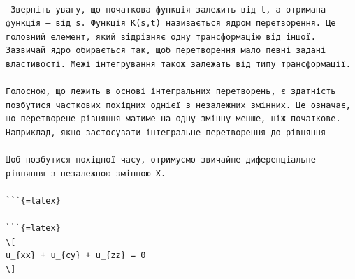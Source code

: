 \documentclass[
  ukrainian,
]{article}
\begin{document}
\begin{verbatim}

 Зверніть увагу, що початкова функція залежить від t, а отримана функція — від s. Функція K(s,t) називається ядром перетворення. Це головний елемент, який відрізняє одну трансформацію від іншої. Зазвичай ядро обирається так, щоб перетворення мало певні задані властивості. Межі інтегрування також залежать від типу трансформації.

Голосною, що лежить в основі інтегральних перетворень, є здатність позбутися часткових похідних однієї з незалежних змінних. Це означає, що перетворене рівняння матиме на одну змінну менше, ніж початкове. Наприклад, якщо застосувати інтегральне перетворення до рівняння

Щоб позбутися похідної часу, отримуємо звичайне диференціальне рівняння з незалежною змінною X.

```{=latex}

```{=latex}
\[
u_{xx} + u_{cy} + u_{zz} = 0
\]
\end{verbatim}
\end{document}
